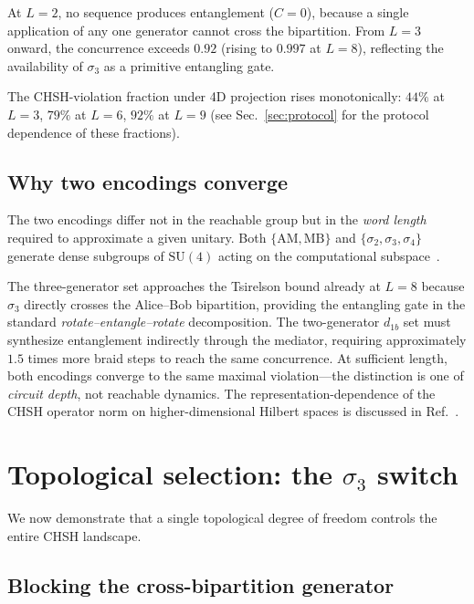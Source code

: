 \documentclass[aps,pra,twocolumn,superscriptaddress,longbibliography,floatfix,nofootinbib]{revtex4-2}
\begin{document}
At $L=2$, no sequence produces entanglement ($C=0$), because a
single application of any one generator cannot cross the
bipartition.
From $L=3$ onward, the concurrence exceeds $0.92$ (rising to $0.997$
at $L=8$), reflecting the availability of $\sigma_3$ as a primitive
entangling gate.

The CHSH-violation fraction under 4D projection rises monotonically:
$44\%$ at $L=3$, $79\%$ at $L=6$, $92\%$ at $L=9$
(see Sec.~\ref{sec:protocol} for the protocol dependence of these
fractions).

\subsection{Why two encodings converge}

The two encodings differ not in the reachable group but in the
\emph{word length} required to approximate a given unitary.
Both $\{\text{AM},\text{MB}\}$ and $\{\sigma_2,\sigma_3,\sigma_4\}$
generate dense subgroups of $\text{SU}(4)$ acting on the
computational subspace~\cite{Bonesteel2005}.

The three-generator set approaches the Tsirelson bound already at $L=8$ because $\sigma_3$
directly crosses the Alice--Bob bipartition, providing the
entangling gate in the standard
\emph{rotate--entangle--rotate} decomposition.
The two-generator $d_{1b}$ set must synthesize entanglement
indirectly through the mediator, requiring approximately $1.5$
times more braid steps to reach the same concurrence.
At sufficient length, both encodings converge to the same
maximal violation---the distinction is one of \emph{circuit depth},
not reachable dynamics. The representation-dependence of the CHSH
operator norm on higher-dimensional Hilbert spaces is discussed in
Ref.~\cite{Sorella2023}.

\section{Topological selection: the $\sigma_3$ switch}
\label{sec:switch}

We now demonstrate that a single topological degree of freedom
controls the entire CHSH landscape.

\subsection{Blocking the cross-bipartition generator}
\end{document}
